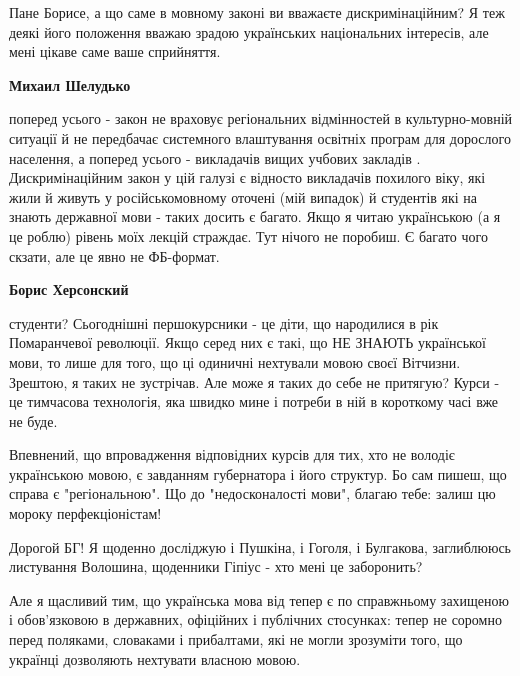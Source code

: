 \begin{itemize}
Пане Борисе, а що саме в мовному законі ви вважаєте дискримінаційним? Я теж
деякі його положення вважаю зрадою українських національних інтересів, але мені
цікаве саме ваше сприйняття.

\begin{itemize}
 
\textbf{Михаил Шелудько} 

поперед усього - закон не враховує регіональних відмінностей в культурно-мовній
ситуації й не передбачає системного влаштування освітніх програм для дорослого
населення, а поперед усього - викладачів вищих учбових закладів .
Дискримінаційним закон у цій галузі є відносто викладачів похилого віку, які
жили й живуть у російськомовному оточені (мій випадок) й студентів які на
знають державної мови - таких досить є багато. Якщо я читаю українською (а я це
роблю) рівень моїх лекцій страждає. Тут нічого не поробиш. Є багато чого
скзати, але це явно не ФБ-формат.


 
\textbf{Борис Херсонский} 

студенти? Сьогоднішні першокурсники - це діти, що народилися в рік Помаранчевої
революції. Якщо серед них є такі, що НЕ ЗНАЮТЬ української мови, то лише для
того, що ці одиничні нехтували мовою своєї Вітчизни. Зрештою, я таких не
зустрічав. Але може я таких до себе не притягую? Курси - це тимчасова
технологія, яка швидко мине і потреби в ній в короткому часі вже не буде.

Впевнений, що впровадження відповідних курсів для тих, хто не володіє
українською мовою, є завданням губернатора і його структур. Бо сам пишеш, що
справа є "регіональною". Що до "недосконалості мови", благаю тебе: залиш цю
мороку перфекціоністам! 

Дорогой БГ! Я щоденно досліджую і Пушкіна, і Гоголя, і Булгакова, заглиблююсь
листування Волошина, щоденники Гіпіус - хто мені це заборонить? 

Але я щасливий тим, що українська мова від тепер є по справжньому захищеною і
обов'язковою в державних, офіційних і публічних стосунках: тепер не соромно
перед поляками, словаками і прибалтами, які не могли зрозуміти того, що
українці дозволяють нехтувати власною мовою. 


\end{itemize}
\end{itemize}
